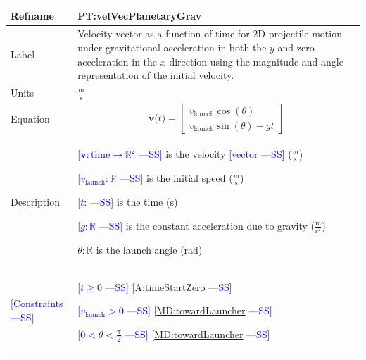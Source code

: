 \documentclass[12pt]{article}
\newcommand{\authornote}[3]{\textcolor{#1}{[#3 ---#2]}}
\newcommand{\authornote}[3]{}
\newcommand{\wss}[1]{\authornote{blue}{SS}{#1}}
\begin{document}
\noindent
\begin{minipage}{\textwidth}
\begin{tabular}{>{\raggedright}p{}>{\raggedright\arraybackslash}p{}}
\toprule \textbf{Refname} & \textbf{PT:velVecPlanetaryGrav} 
\label{PT:velVecPlanetaryGrav} \\ \midrule Label & Velocity vector as a function
of time for 2D projectile motion under gravitational acceleration in both the
$y$ and zero acceleration in the $x$ direction using the magnitude and angle
representation of the initial velocity.
        
\\ \midrule
Units & $\frac{\text{m}}{\text{s}}$
        
\\ \midrule
Equation & \begin{displaymath}
           \symbf{v}\text{(}t\text{)}=\begin{bmatrix}
                                      {{v}_{\text{launch}}} \cos(\theta)\\
                                      {{v}_{\text{launch}}} \sin(\theta) - gt
                                      \end{bmatrix}
           \end{displaymath}
\\ \midrule
Description & \begin{symbDescription}
              \item{\wss{$\symbf{v}: \text{time} \rightarrow \mathbb{R}^2$} is the velocity \wss{vector} ($\frac{\text{m}}{\text{s}}$)}
              \item{\wss{${{v}_{\text{launch}}}: \mathbb{R}$} is the initial speed ($\frac{\text{m}}{\text{s}}$)}
              \item{\wss{$t$: \text{time}} is the time (${\text{s}}$)}
              \item{\wss{$g: \mathbb{R}$} is the constant acceleration due to gravity ($\frac{\text{m}}{\text{s}^{2}}$)}
              \item $\theta: \mathbb{R}$ is the launch angle (rad)
              \end{symbDescription}

\\ \midrule
\wss{Constraints} & 
\begin{symbDescription}
\item \wss{$t \geq 0$} \wss{\hyperref[timeStartZero]{A:timeStartZero}}
\item \wss{$v_\text{launch} > 0$} \wss{\hyperref[MD:towardLauncher]{MD:towardLauncher}}
\item \wss{$
0 < \theta < \frac{\pi}{2}$} \wss{\hyperref[MD:towardLauncher]{MD:towardLauncher}}
\end{symbDescription}


\end{tabular}
\end{minipage}
\end{document}
